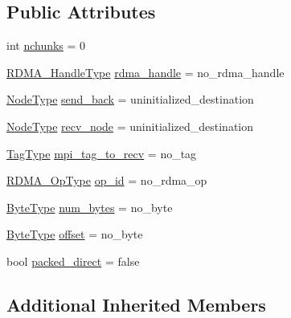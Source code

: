 \subsection*{Public Attributes}
\begin{DoxyCompactItemize}
\item 
int \hyperlink{structvt_1_1rdma_1_1_send_data_message_a47083ce90f9cbdaf648ec3956e340b71}{nchunks} = 0
\item 
\hyperlink{namespacevt_a10442579ec4e7ebef223818e64bcf908}{R\+D\+M\+A\+\_\+\+Handle\+Type} \hyperlink{structvt_1_1rdma_1_1_send_data_message_ad9577ac0894f4d2457d7ac31d85e9042}{rdma\+\_\+handle} = no\+\_\+rdma\+\_\+handle
\item 
\hyperlink{namespacevt_a866da9d0efc19c0a1ce79e9e492f47e2}{Node\+Type} \hyperlink{structvt_1_1rdma_1_1_send_data_message_a9dc041340e97f80049273da30b9214cb}{send\+\_\+back} = uninitialized\+\_\+destination
\item 
\hyperlink{namespacevt_a866da9d0efc19c0a1ce79e9e492f47e2}{Node\+Type} \hyperlink{structvt_1_1rdma_1_1_send_data_message_ad825529ece23e2f7112f825a0e8b24e1}{recv\+\_\+node} = uninitialized\+\_\+destination
\item 
\hyperlink{namespacevt_a84ab281dae04a52a4b243d6bf62d0e52}{Tag\+Type} \hyperlink{structvt_1_1rdma_1_1_send_data_message_a012836b7e2327b722e73bb52f416fe25}{mpi\+\_\+tag\+\_\+to\+\_\+recv} = no\+\_\+tag
\item 
\hyperlink{namespacevt_1_1rdma_a9b966d9780a2b41afe7cd7b7b4b20300}{R\+D\+M\+A\+\_\+\+Op\+Type} \hyperlink{structvt_1_1rdma_1_1_send_data_message_a202afd4750d22c74325b5709db5e025a}{op\+\_\+id} = no\+\_\+rdma\+\_\+op
\item 
\hyperlink{namespacevt_aab8d55968084610ce3b17057981e9300}{Byte\+Type} \hyperlink{structvt_1_1rdma_1_1_send_data_message_ab8941e418cfa243cfa88b67855d3e300}{num\+\_\+bytes} = no\+\_\+byte
\item 
\hyperlink{namespacevt_aab8d55968084610ce3b17057981e9300}{Byte\+Type} \hyperlink{structvt_1_1rdma_1_1_send_data_message_a5dbd859d2b95948103b770322ee85d56}{offset} = no\+\_\+byte
\item 
bool \hyperlink{structvt_1_1rdma_1_1_send_data_message_a8d6ac5c7d5ea89478b7309dd26f04f76}{packed\+\_\+direct} = false
\end{DoxyCompactItemize}
\subsection*{Additional Inherited Members}


